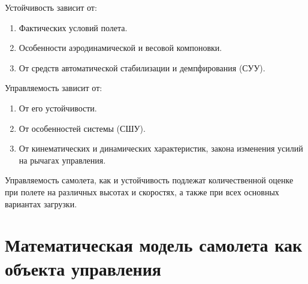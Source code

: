 \documentclass{article}
\begin{document}
Устойчивость зависит от:
\begin{enumerate}
	\item Фактических условий полета.
	\item Особенности аэродинамической и весовой компоновки.
	\item От средств автоматической стабилизации и демпфирования (СУУ).
\end{enumerate}
Управляемость зависит от:
\begin{enumerate}
	\item От его устойчивости.
	\item От особенностей системы (СШУ).
	\item От кинематических и динамических характеристик, закона изменения
	      усилий на рычагах управления.
\end{enumerate}

Управляемость самолета, как и устойчивость подлежат количественной оценке при
полете на различных высотах и скоростях, а также при всех основных вариантах
загрузки.
\newpage

\section{Математическая модель самолета как объекта управления}
\end{document}
